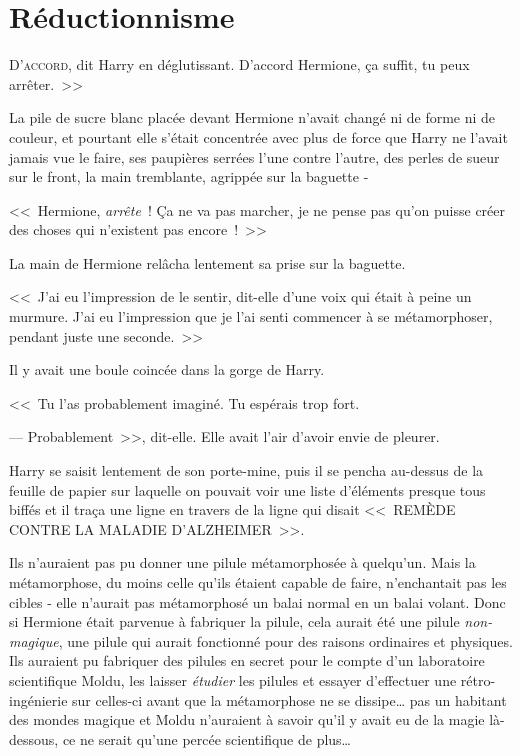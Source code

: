 \chapter{Réductionnisme}

\lettrine[ante=<<~]{D}{'accord}, dit Harry en déglutissant. D'accord Hermione, ça suffit, tu peux arrêter.~>>

La pile de sucre blanc placée devant Hermione n'avait changé ni de forme ni de couleur, et pourtant elle s'était concentrée avec plus de force que Harry ne l'avait jamais vue le faire, ses paupières serrées l'une contre l'autre, des perles de sueur sur le front, la main tremblante, agrippée sur la baguette -

<<~Hermione, \emph{arrête}~! Ça ne va pas marcher, je ne pense pas qu'on puisse créer des choses qui n'existent pas encore~!~>>

La main de Hermione relâcha lentement sa prise sur la baguette.

<<~J'ai eu l'impression de le sentir, dit-elle d'une voix qui était à peine un murmure. J'ai eu l'impression que je l'ai senti commencer à se métamorphoser, pendant juste une seconde.~>>

Il y avait une boule coincée dans la gorge de Harry.

<<~Tu l'as probablement imaginé. Tu espérais trop fort.

--- Probablement~>>, dit-elle. Elle avait l'air d'avoir envie de pleurer.

Harry se saisit lentement de son porte-mine, puis il se pencha au-dessus de la feuille de papier sur laquelle on pouvait voir une liste d'éléments presque tous biffés et il traça une ligne en travers de la ligne qui disait <<~REMÈDE CONTRE LA MALADIE D'ALZHEIMER~>>.

Ils n'auraient pas pu donner une pilule métamorphosée à quelqu'un. Mais la métamorphose, du moins celle qu'ils étaient capable de faire, n'enchantait pas les cibles - elle n'aurait pas métamorphosé un balai normal en un balai volant. Donc si Hermione était parvenue à fabriquer la pilule, cela aurait été une pilule \emph{non-magique}, une pilule qui aurait fonctionné pour des raisons ordinaires et physiques. Ils auraient pu fabriquer des pilules en secret pour le compte d'un laboratoire scientifique Moldu, les laisser \emph{étudier} les pilules et essayer d'effectuer une rétro-ingénierie sur celles-ci avant que la métamorphose ne se dissipe… pas un habitant des mondes magique et Moldu n'auraient à savoir qu'il y avait eu de la magie là-dessous, ce ne serait qu'une percée scientifique de plus…


